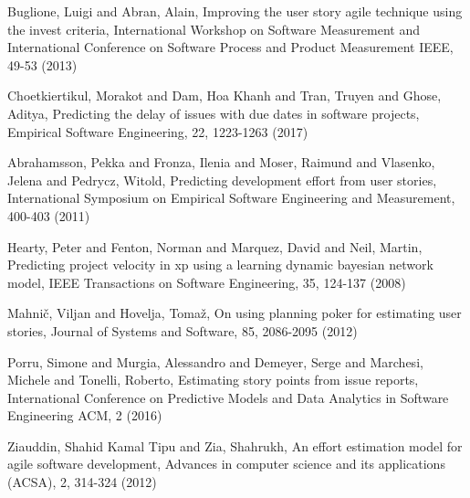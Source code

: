 \begin{thebibliography}{}
%
%




Buglione, Luigi and Abran, Alain, Improving the user story agile technique using the invest criteria, International Workshop on Software Measurement and International Conference on Software Process and Product Measurement IEEE, 49-53 (2013)

Choetkiertikul, Morakot and Dam, Hoa Khanh and Tran, Truyen and Ghose, Aditya, Predicting the delay of issues with due dates in software projects, Empirical Software Engineering, 22, 1223-1263 (2017)

Abrahamsson, Pekka and Fronza, Ilenia and Moser, Raimund and Vlasenko, Jelena and Pedrycz, Witold, Predicting development effort from user stories, International Symposium on Empirical Software Engineering and Measurement, 400-403 (2011)

Hearty, Peter and Fenton, Norman and Marquez, David and Neil, Martin, Predicting project velocity in xp using a learning dynamic bayesian network model, IEEE Transactions on Software Engineering, 35, 124-137 (2008)

Mahni{\v{c}}, Viljan and Hovelja, Toma{\v{z}}, On using planning poker for estimating user stories, Journal of Systems and Software, 85, 2086-2095 (2012)

Porru, Simone and Murgia, Alessandro and Demeyer, Serge and Marchesi, Michele and Tonelli, Roberto, Estimating story points from issue reports, International Conference on Predictive Models and Data Analytics in Software Engineering ACM, 2 (2016)

Ziauddin, Shahid Kamal Tipu and Zia, Shahrukh, An effort estimation model for agile software development, Advances in computer science and its applications (ACSA), 2, 314-324 (2012)


\end{thebibliography}
